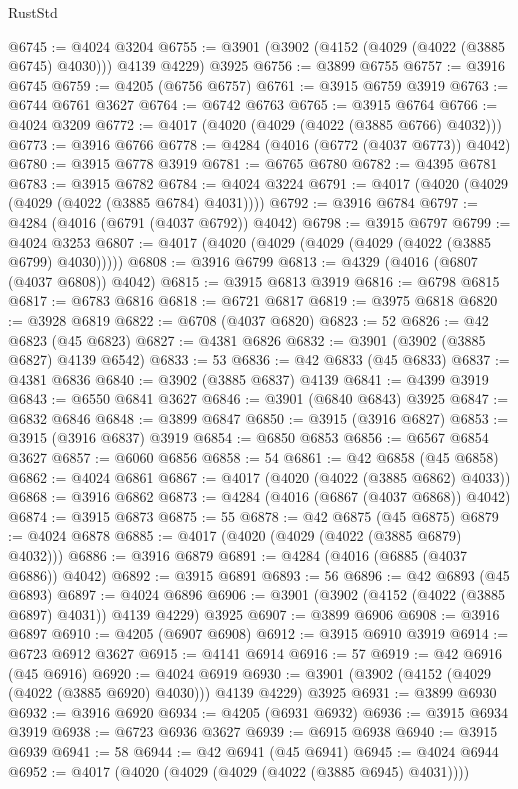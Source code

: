 \begin{lexlean}{RustStd}
\begin{coremodule}
@6745 := @4024 @3204
@6755 := @3901 (@3902 (@4152 (@4029 (@4022 (@3885 @6745) @4030))) @4139 @4229) @3925
@6756 := @3899 @6755
@6757 := @3916 @6745
@6759 := @4205 (@6756 @6757)
@6761 := @3915 @6759 @3919
@6763 := @6744 @6761 @3627
@6764 := @6742 @6763
@6765 := @3915 @6764
@6766 := @4024 @3209
@6772 := @4017 (@4020 (@4029 (@4022 (@3885 @6766) @4032)))
@6773 := @3916 @6766
@6778 := @4284 (@4016 (@6772 (@4037 @6773)) @4042)
@6780 := @3915 @6778 @3919
@6781 := @6765 @6780
@6782 := @4395 @6781
@6783 := @3915 @6782
@6784 := @4024 @3224
@6791 := @4017 (@4020 (@4029 (@4029 (@4022 (@3885 @6784) @4031))))
@6792 := @3916 @6784
@6797 := @4284 (@4016 (@6791 (@4037 @6792)) @4042)
@6798 := @3915 @6797
@6799 := @4024 @3253
@6807 := @4017 (@4020 (@4029 (@4029 (@4029 (@4022 (@3885 @6799) @4030)))))
@6808 := @3916 @6799
@6813 := @4329 (@4016 (@6807 (@4037 @6808)) @4042)
@6815 := @3915 @6813 @3919
@6816 := @6798 @6815
@6817 := @6783 @6816
@6818 := @6721 @6817
@6819 := @3975 @6818
@6820 := @3928 @6819
@6822 := @6708 (@4037 @6820)
@6823 := 52
@6826 := @42 @6823 (@45 @6823)
@6827 := @4381 @6826
@6832 := @3901 (@3902 (@3885 @6827) @4139 @6542)
@6833 := 53
@6836 := @42 @6833 (@45 @6833)
@6837 := @4381 @6836
@6840 := @3902 (@3885 @6837) @4139
@6841 := @4399 @3919
@6843 := @6550 @6841 @3627
@6846 := @3901 (@6840 @6843) @3925
@6847 := @6832 @6846
@6848 := @3899 @6847
@6850 := @3915 (@3916 @6827)
@6853 := @3915 (@3916 @6837) @3919
@6854 := @6850 @6853
@6856 := @6567 @6854 @3627
@6857 := @6060 @6856
@6858 := 54
@6861 := @42 @6858 (@45 @6858)
@6862 := @4024 @6861
@6867 := @4017 (@4020 (@4022 (@3885 @6862) @4033))
@6868 := @3916 @6862
@6873 := @4284 (@4016 (@6867 (@4037 @6868)) @4042)
@6874 := @3915 @6873
@6875 := 55
@6878 := @42 @6875 (@45 @6875)
@6879 := @4024 @6878
@6885 := @4017 (@4020 (@4029 (@4022 (@3885 @6879) @4032)))
@6886 := @3916 @6879
@6891 := @4284 (@4016 (@6885 (@4037 @6886)) @4042)
@6892 := @3915 @6891
@6893 := 56
@6896 := @42 @6893 (@45 @6893)
@6897 := @4024 @6896
@6906 := @3901 (@3902 (@4152 (@4022 (@3885 @6897) @4031)) @4139 @4229) @3925
@6907 := @3899 @6906
@6908 := @3916 @6897
@6910 := @4205 (@6907 @6908)
@6912 := @3915 @6910 @3919
@6914 := @6723 @6912 @3627
@6915 := @4141 @6914
@6916 := 57
@6919 := @42 @6916 (@45 @6916)
@6920 := @4024 @6919
@6930 := @3901 (@3902 (@4152 (@4029 (@4022 (@3885 @6920) @4030))) @4139 @4229) @3925
@6931 := @3899 @6930
@6932 := @3916 @6920
@6934 := @4205 (@6931 @6932)
@6936 := @3915 @6934 @3919
@6938 := @6723 @6936 @3627
@6939 := @6915 @6938
@6940 := @3915 @6939
@6941 := 58
@6944 := @42 @6941 (@45 @6941)
@6945 := @4024 @6944
@6952 := @4017 (@4020 (@4029 (@4029 (@4022 (@3885 @6945) @4031))))

\end{coremodule}
\end{lexlean}
